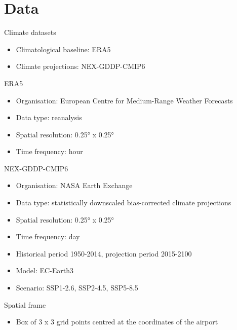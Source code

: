 \documentclass[aspectratio=43]{beamer}
\begin{document}
\section{Data}
\begin{frame}{Climate datasets}
  \begin{itemize}
    \item Climatological baseline: ERA5
    \item Climate projections: NEX-GDDP-CMIP6
  \end{itemize}
\end{frame}

\begin{frame}{ERA5}
  \begin{itemize}
    \item Organisation: European Centre for Medium-Range Weather Forecasts
    \item Data type: reanalysis
    \item Spatial resolution: 0.25° x 0.25°
    \item Time frequency: hour
  \end{itemize}
\end{frame}

\begin{frame}{NEX-GDDP-CMIP6}
  \begin{itemize}
    \item Organisation: NASA Earth Exchange
    \item Data type: statistically downscaled bias-corrected climate projections
    \item Spatial resolution: 0.25° x 0.25°
    \item Time frequency: day
    \item Historical period 1950-2014, projection period 2015-2100
    \item Model: EC-Earth3
    \item Scenario: SSP1-2.6, SSP2-4.5, SSP5-8.5
  \end{itemize}
\end{frame}

\begin{frame}{Spatial frame}
  \begin{itemize}
    \item Box of 3 x 3 grid points centred at the coordinates of the airport
    \note[item]{}
  \end{itemize}
\end{frame}
\end{document}
